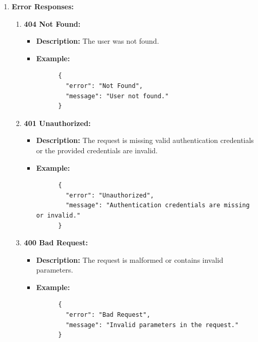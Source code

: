 \documentclass[a4 paper, 12pt]{article}
\begin{document}
\begin{enumerate}
  \item \textbf{Error Responses:}
  \begin{enumerate}
    \item \textbf{404 Not Found:}
    \begin{itemize}
      \item \textbf{Description:} The user was not found.
      \item \textbf{Example:}
      \begin{verbatim}
      {
        "error": "Not Found",
        "message": "User not found."
      }
      \end{verbatim}
    \end{itemize}

    \item \textbf{401 Unauthorized:}
    \begin{itemize}
      \item \textbf{Description:} The request is missing valid authentication credentials or the provided credentials are invalid.
      \item \textbf{Example:}
      \begin{verbatim}
      {
        "error": "Unauthorized",
        "message": "Authentication credentials are missing or invalid."
      }
      \end{verbatim}
    \end{itemize}

    \item \textbf{400 Bad Request:}
    \begin{itemize}
      \item \textbf{Description:} The request is malformed or contains invalid parameters.
      \item \textbf{Example:}
      \begin{verbatim}
      {
        "error": "Bad Request",
        "message": "Invalid parameters in the request."
      }
      \end{verbatim}
    \end{itemize}
  \end{enumerate}
\end{enumerate}
\end{document}
